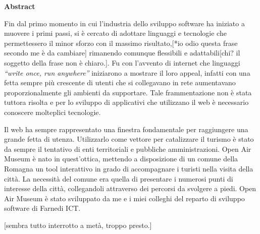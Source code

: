 \thispagestyle{empty}

\begin{flushleft}
	
  {\bf \Huge Abstract}

\vspace{4cm}

Fin dal primo momento in cui l’industria dello sviluppo software ha iniziato a muovere i primi passi, si è cercato di adottare linguaggi e tecnologie che permettessero il minor sforzo con il massimo risultato,[*io odio questa frase secondo me è da cambiare] rimanendo comunque flessibili e adattabili[chi? il soggetto della frase non è chiaro.]. Fu con l’avvento di internet che linguaggi \emph{“write once, run anywhere”} iniziarono a mostrare il loro appeal, infatti con una fetta sempre più crescente di utenti che si collegavano in rete aumentavano proporzionalmente gli ambienti da supportare. Tale frammentazione non è stata tuttora risolta e per lo sviluppo di applicativi che utilizzano il web è necessario conoscere molteplici tecnologie.\vspace{5mm}

\setlength{\parindent}{5ex}
Il web ha sempre rappresentato una finestra fondamentale per raggiungere una grande fetta di utenza. Utilizzarlo come vettore per catalizzare il turismo è stato da sempre il tentativo di enti territoriali e pubbliche amministrazioni. Open Air Museum è nato in quest'ottica, mettendo a disposizione di un comune della Romagna un tool interattivo in grado di accompagnare i turisti nella visita della città. La necessità del comune era quella di presentare i numerosi punti di interesse della città, collegandoli attraverso dei percorsi da svolgere a piedi. Open Air Museum è stato sviluppato da me e i miei colleghi del reparto di sviluppo software di Farnedi ICT.\vspace{5mm}

[sembra tutto interrotto a metà, troppo presto.]

\end{flushleft}